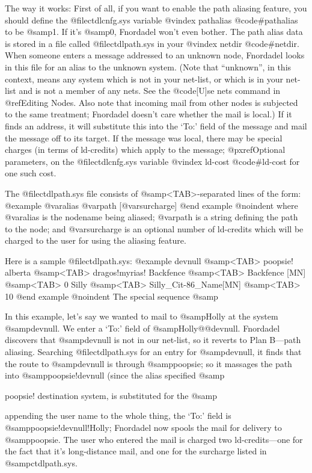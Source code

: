 {The way it works:  First of all, if you want to enable
the path aliasing feature, you should define the @file{ctdlcnfg.sys}
variable
@vindex pathalias
@code{#pathalias} to be @samp{1}.  If it's @samp{0}, Fnordadel won't
even bother.  The path alias data is stored in a file called
@file{ctdlpath.sys} in your
@vindex netdir
@code{#netdir}.  When someone enters a message
addressed to an unknown node, Fnordadel looks in this file for
an alias to the unknown system.  (Note that ``unknown'', in this
context, means any system which is not in your net-list, or which
is in your net-list and is not a member of any nets.
See the @code{[U]se nets} command in @ref{Editing Nodes}.
Also note that incoming mail from other nodes is
subjected to the same treatment; Fnordadel doesn't care
whether the mail is local.)  If it finds an address, it will
substitute this into the `To:' field of the message and mail the
message off to its target.  If the message was local, there may
be special charges (in terms of ld-credits) which apply to the
message; @pxref{Optional parameters}, on the @file{ctdlcnfg.sys} variable
@vindex ld-cost
@code{#ld-cost} for one such cost.

The @file{ctdlpath.sys} file consists of @samp{<TAB>}-separated lines of the form:
@example
@var{alias} @var{path} [@var{surcharge}]
@end example
@noindent
where @var{alias} is the nodename being aliased;
@var{path} is a string defining the path to the node; and
@var{surcharge} is an optional number of ld-credits
which will be charged to the user for using the
aliasing feature.

Here is a sample @file{ctdlpath.sys}:
@example
devnull @samp{<TAB>} poopsie!%
alberta @samp{<TAB>} dragos!myrias!%
Backfence @samp{<TAB>} Backfence [MN] @samp{<TAB>} 0
Silly @samp{<TAB>} Silly_Cit-86_Name[MN] @samp{<TAB>} 10
@end example
@noindent
The special sequence @samp{%
In this example, let's say we wanted to mail to @samp{Holly} at the
system @samp{devnull}.  We enter a `To:' field of @samp{Holly@@devnull}.
Fnordadel discovers that @samp{devnull} is not in our net-list, so
it reverts to Plan B---path aliasing.  Searching @file{ctdlpath.sys}
for an entry for @samp{devnull}, it finds that the route to @samp{devnull} is
through @samp{poopsie}; so it massages the path into @samp{poopsie!devnull}
(since the alias specified @samp{poopsie!%
destination system, is substituted for the @samp{%
appending the user name to the whole thing, the `To:' field is
@samp{poopsie!devnull!Holly}; Fnordadel now spools the mail for
delivery to @samp{poopsie}.  The user who entered the mail is charged
two ld-credits---one for the fact that it's long-distance mail,
and one for the surcharge listed in @samp{ctdlpath.sys}.

}}}}
